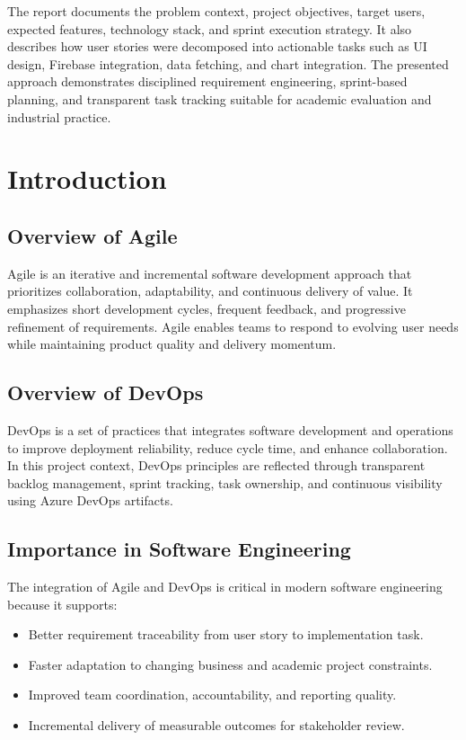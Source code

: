 \documentclass[12pt,a4paper]{article}
\begin{document}
The report documents the problem context, project objectives, target users, expected features, technology stack, and sprint execution strategy. It also describes how user stories were decomposed into actionable tasks such as UI design, Firebase integration, data fetching, and chart integration. The presented approach demonstrates disciplined requirement engineering, sprint-based planning, and transparent task tracking suitable for academic evaluation and industrial practice.

\section{Introduction}
\subsection{Overview of Agile}
Agile is an iterative and incremental software development approach that prioritizes collaboration, adaptability, and continuous delivery of value. It emphasizes short development cycles, frequent feedback, and progressive refinement of requirements. Agile enables teams to respond to evolving user needs while maintaining product quality and delivery momentum.

\subsection{Overview of DevOps}
DevOps is a set of practices that integrates software development and operations to improve deployment reliability, reduce cycle time, and enhance collaboration. In this project context, DevOps principles are reflected through transparent backlog management, sprint tracking, task ownership, and continuous visibility using Azure DevOps artifacts.

\subsection{Importance in Software Engineering}
The integration of Agile and DevOps is critical in modern software engineering because it supports:
\begin{itemize}
    \item Better requirement traceability from user story to implementation task.
    \item Faster adaptation to changing business and academic project constraints.
    \item Improved team coordination, accountability, and reporting quality.
    \item Incremental delivery of measurable outcomes for stakeholder review.
\end{itemize}
\end{document}
